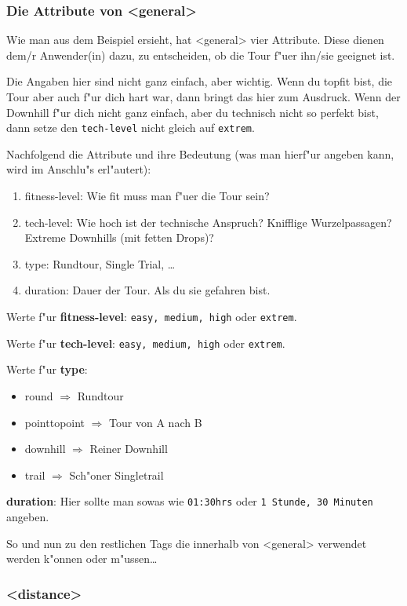 \subsubsection{Die Attribute von <general>}
Wie man aus dem Beispiel ersieht, hat <general> vier
Attribute. Diese dienen dem/r Anwender(in) dazu, zu 
entscheiden, ob die Tour f"uer ihn/sie geeignet ist.

Die Angaben hier sind nicht ganz einfach, aber wichtig.
Wenn du topfit bist, die Tour aber auch f"ur dich
hart war, dann bringt das hier zum Ausdruck. Wenn
der Downhill f"ur dich nicht ganz einfach, aber du
technisch nicht so perfekt bist, dann setze den 
\texttt{tech-level} nicht gleich auf \texttt{extrem}.

Nachfolgend die Attribute und ihre Bedeutung (was man
hierf"ur angeben kann, wird im Anschlu"s erl"autert):
\begin{enumerate}
\item fitness-level: Wie fit muss man f"uer die Tour sein?
\item tech-level: Wie hoch ist der technische Anspruch?
      Knifflige Wurzelpassagen? Extreme Downhills (mit
      fetten Drops)?
\item type: Rundtour, Single Trial, \ldots
\item duration: Dauer der Tour. Als du sie gefahren
      bist.
\end{enumerate}

Werte f"ur \textbf{fitness-level}: \texttt{easy, medium, high} 
oder \texttt{extrem}.

Werte f"ur \textbf{tech-level}: \texttt{easy, medium, high} 
oder \texttt{extrem}.

Werte f"ur \textbf{type}:
\begin{itemize}
\item round $\Rightarrow$ Rundtour
\item pointtopoint $\Rightarrow$ Tour von A nach B
\item downhill $\Rightarrow$ Reiner Downhill
\item trail $\Rightarrow$ Sch"oner Singletrail
\end{itemize}

\textbf{duration}: Hier sollte man sowas wie \texttt{01:30hrs}
oder \texttt{1 Stunde, 30 Minuten} angeben.

So und nun zu den restlichen Tags die innerhalb von
<general> verwendet werden k"onnen oder m"ussen\ldots

\subsubsection{<distance>}
